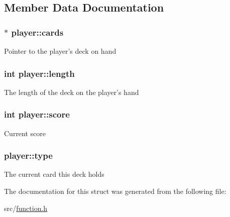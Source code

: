 \subsection{Member Data Documentation}
\hypertarget{structplayer_ac6f2eae012a4e35f71eec51303ec0d9d}{
\subsubsection[{cards}]{$\ast$ player\+::cards}}\label{structplayer_ac6f2eae012a4e35f71eec51303ec0d9d}
Pointer to the player's deck on hand \hypertarget{structplayer_a6d670ec4ace3ecf0f24cfce0e91d8f58}{
\subsubsection[{length}]{\setlength{\rightskip}{0pt plus 5cm}int player\+::length}}\label{structplayer_a6d670ec4ace3ecf0f24cfce0e91d8f58}
The length of the deck on the player's hand \hypertarget{structplayer_a0effac341657c96528752f808fa23291}{
\subsubsection[{score}]{\setlength{\rightskip}{0pt plus 5cm}int player\+::score}}\label{structplayer_a0effac341657c96528752f808fa23291}
Current score \hypertarget{structplayer_a59539d94e84700858ac1b21e93bdfa83}{
\subsubsection[{type}]{ player\+::type}}\label{structplayer_a59539d94e84700858ac1b21e93bdfa83}
The current card this deck holds 

The documentation for this struct was generated from the following file\+:\begin{DoxyCompactItemize}
\item 
src/\hyperlink{function_8h}{function.\+h}\end{DoxyCompactItemize}

